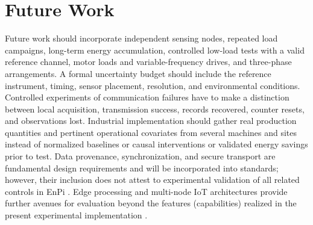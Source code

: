 \documentclass[technologies,article,submit,pdftex,moreauthors]{Definitions/mdpi}
\begin{document}
\section{Future Work}
\label{sec:future-work}
Future work should incorporate independent sensing nodes, repeated load campaigns, long-term energy accumulation, controlled low-load tests with a valid reference channel, motor loads and variable-frequency drives, and three-phase arrangements. A formal uncertainty budget should include the reference instrument, timing, sensor placement, resolution, and environmental conditions. Controlled experiments of communication failures have to make a distinction between local acquisition, transmission success, records recovered, counter resets, and observations lost. Industrial implementation should gather real production quantities and pertinent operational covariates from several machines and sites instead of normalized baselines or causal interventions or validated energy savings prior to test. Data provenance, synchronization, and secure transport are fundamental design requirements and will be incorporated into standards; however, their inclusion does not attest to experimental validation of all related controls in EnPi \cite{r2_ntp,r2_rfc3339,r2_prov,r2_tls}. Edge processing and multi-node IoT architectures provide further avenues for evaluation beyond the features (capabilities) realized in the present experimental implementation \cite{r2_gubbi,r2_shi}. 
\end{document}
